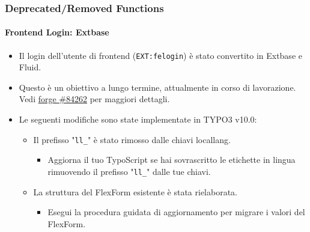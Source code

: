 \begin{frame}[fragile]
	\frametitle{Deprecated/Removed Functions}
	\framesubtitle{Frontend Login: Extbase}

	\begin{itemize}
		\item Il login dell'utente di frontend (\texttt{EXT:felogin}) è stato convertito in Extbase e Fluid.

		\item Questo è un obiettivo a lungo termine, attualmente in corso di lavorazione.\newline
			Vedi \href{https://forge.typo3.org/issues/84262}{forge \#84262} per maggiori dettagli.

		\item Le seguenti modifiche sono state implementate in TYPO3 v10.0:

		\begin{itemize}
			\item[\ding{202}] Il prefisso "\texttt{ll\_}" è stato rimosso dalle chiavi locallang.

				\begin{itemize}
					\item[\ding{228}] Aggiorna il tuo TypoScript se hai sovrascritto le etichette in lingua rimuovendo il prefisso "\texttt{ll\_}" dalle tue chiavi.
				\end{itemize}

			\item[\ding{203}] La struttura del FlexForm esistente è stata rielaborata.

				\begin{itemize}
					\item[\ding{228}] Esegui la procedura guidata di aggiornamento per migrare i valori del FlexForm.
				\end{itemize}

		\end{itemize}

	\end{itemize}

\end{frame}


